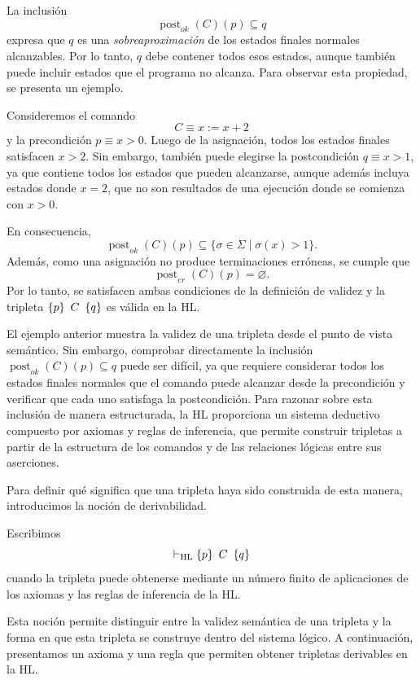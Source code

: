 \documentclass[a4paper,	11pt]{report}
\begin{document}
La inclusión
$$\operatorname{post}_{ok}(C)(p) \subseteq q$$
expresa que $q$ es una \emph{sobreaproximación} de los estados finales normales alcanzables.
Por lo tanto, $q$ debe contener todos esos estados,
aunque también puede incluir estados que el programa no alcanza.
Para observar esta propiedad, se presenta un ejemplo.

\begin{ejemplo}
\label{eje:sobreaprox}
Consideremos el comando
$$C \equiv x := x + 2$$
y la precondición $p \equiv x > 0$.
Luego de la asignación, todos los estados finales satisfacen $x > 2$.
Sin embargo, también puede elegirse la postcondición $q \equiv x > 1$,
ya que contiene todos los estados que pueden alcanzarse,
aunque además incluya estados donde $x = 2$,
que no son resultados de una ejecución donde se comienza con $x > 0$.

En consecuencia,
$$\operatorname{post}_{ok}(C)(p) \subseteq \{\sigma \in \Sigma \mid \sigma(x) > 1\}.$$
Además, como una asignación no produce terminaciones erróneas,
se cumple que
$$\operatorname{post}_{er}(C)(p) = \varnothing.$$
Por lo tanto,
se satisfacen ambas condiciones de la definición de validez y la tripleta $\left\{ p \right\}~C~\left\{ q \right\}$ es válida en la HL.
\end{ejemplo}

El ejemplo anterior muestra la validez de una tripleta desde el punto de vista semántico.
Sin embargo, comprobar directamente la inclusión $\operatorname{post}_{ok}(C)(p) \subseteq q$
puede ser difícil,
ya que requiere considerar todos los estados finales normales que el comando puede alcanzar desde la
precondición y verificar que cada uno satisfaga la postcondición.
Para razonar sobre esta inclusión de manera estructurada,
la HL proporciona un sistema deductivo compuesto por axiomas y reglas de inferencia,
que permite construir tripletas a partir de la estructura de los comandos y
de las relaciones lógicas entre sus aserciones.

Para definir qué significa que una tripleta haya sido construida de esta manera,
introducimos la noción de derivabilidad.

\begin{definicion}
\label{def:deriv-hl}
Escribimos
$$\vdash_{\mathrm{HL}} \left\{ p \right\}~C~\left\{ q \right\}$$
cuando la tripleta puede obtenerse mediante un número finito de aplicaciones de los axiomas y las reglas de inferencia de la HL.
\end{definicion}

Esta noción permite distinguir entre la validez semántica de una tripleta y
la forma en que esta tripleta se construye dentro del sistema lógico.
A continuación, presentamos un axioma y una regla que permiten obtener tripletas derivables en la HL.
\end{document}
